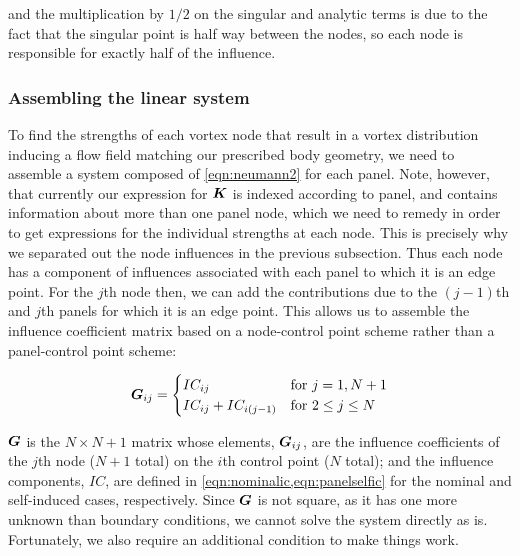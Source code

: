 \noindent and the multiplication by \(1/2\) on the singular and analytic terms is due to the fact that the singular point is half way between the nodes, so each node is responsible for exactly half of the influence.



\subsubsection{Assembling the linear system}

To find the strengths of each vortex node that result in a vortex distribution inducing a flow field matching our prescribed body geometry, we need to assemble a system composed of \cref{eqn:neumann2} for each panel.
%
Note, however, that currently our expression for \(\bm{K}\) is indexed according to panel, and contains information about more than one panel node, which we need to remedy in order to get expressions for the individual strengths at each node.
%
This is precisely why we separated out the node influences in the previous subsection.
%
Thus each node has a component of influences associated with each panel to which it is an edge point.
%
For the \(j\)th node then, we can add the contributions due to the \((j-1)\)th and \(j\)th panels for which it is an edge point.
%
This allows us to assemble the influence coefficient matrix based on a node-control point scheme rather than a panel-control point scheme:

\begin{equation}
\vect{G}_{ij} =
    \begin{cases}
        IC_{ij}        \hfill & \text{for }j=1,N+1 \\
        IC_{ij} + IC_{i(j-1)} & \text{for }2 \leq j \leq N \\
    \end{cases}
\end{equation}

\where \(\bm{G}\) is the \(N \times N+1\) matrix whose elements, \(\bm{G}_{ij}\), are the influence coefficients of the \(j\)th node (\(N+1\) total) on the \(i\)th control point (\(N\) total); and the influence components, \(IC\), are defined in \cref{eqn:nominalic,eqn:panelselfic} for the nominal and self-induced cases, respectively.
%
Since \(\bm{G}\) is not square, as it has one more unknown than boundary conditions, we cannot solve the system directly as is.
%
Fortunately, we also require an additional condition to make things work.

